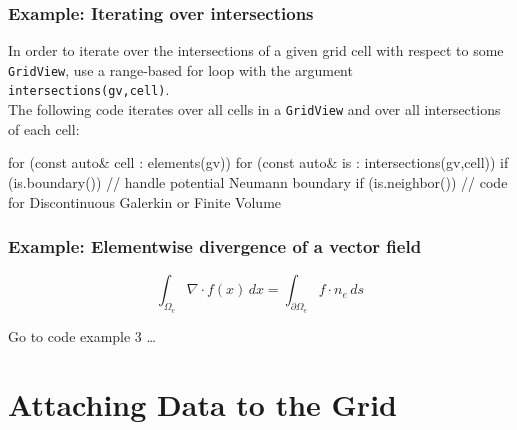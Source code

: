 \documentclass[aspectratio=169,11pt]{beamer}
\theoremstyle{definition}
\begin{document}
\begin{frame}[fragile]
\begin{columns}
\begin{column}{0.25\linewidth}
\begin{center}
      \end{center}
    \end{column}
  \end{columns}

\end{frame}



\begin{frame}[fragile] \frametitle{Example: Iterating over intersections}
In order to iterate over the intersections of a given grid cell with respect to some
\lstinline!GridView!, use a range-based for loop with the argument \lstinline!intersections(gv,cell)!.\\[.5em]
The following code iterates over all cells in a \lstinline!GridView! and over all intersections of each cell:
\begin{cppcode}
for (const auto& cell : elements(gv))
  for (const auto& is : intersections(gv,cell)) {
    if (is.boundary()) {
      // handle potential Neumann boundary
    }
    if (is.neighbor()) {
      // code for Discontinuous Galerkin or Finite Volume
    }
  }
\end{cppcode}
\end{frame}

\begin{frame}[fragile] \frametitle{Example: Elementwise divergence of a vector field}
\begin{equation*}
\int_{\Omega_e} \nabla\cdot f(x) \,dx = \int_{\partial \Omega_e} f\cdot n_e \,ds
\end{equation*}
\bigskip
\begin{center}
Go to code example 3 \ldots
\end{center}
\end{frame}

\section{Attaching Data to the Grid}
\end{document}
